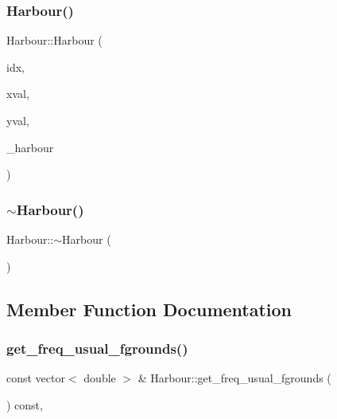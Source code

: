 \subsubsection{\texorpdfstring{Harbour()}{Harbour()}\hspace{0.1cm}{\footnotesize\ttfamily [4/4]}}
{\footnotesize\ttfamily Harbour\+::\+Harbour (\begin{DoxyParamCaption}\item[{\mbox{\hyperlink{classtypes_1_1_node_id}{types\+::\+Node\+Id}}}]{idx,  }\item[{double}]{xval,  }\item[{double}]{yval,  }\item[{int}]{\+\_\+harbour }\end{DoxyParamCaption})}

\mbox{\label{class_harbour_a19531317d6f077172d96a77c09104c22}} 
\subsubsection{\texorpdfstring{$\sim$Harbour()}{~Harbour()}}
{\footnotesize\ttfamily Harbour\+::$\sim$\+Harbour (\begin{DoxyParamCaption}{ }\end{DoxyParamCaption})}



\subsection{Member Function Documentation}
\mbox{\label{class_harbour_aa221dcf584dfc88a172c0aa890fee7ed}} 
\subsubsection{\texorpdfstring{get\_freq\_usual\_fgrounds()}{get\_freq\_usual\_fgrounds()}}
{\footnotesize\ttfamily const vector$<$ double $>$ \& Harbour\+::get\+\_\+freq\+\_\+usual\+\_\+fgrounds (\begin{DoxyParamCaption}{ }\end{DoxyParamCaption}) const\hspace{0.3cm}{\ttfamily [override]}, {\ttfamily [virtual]}}



